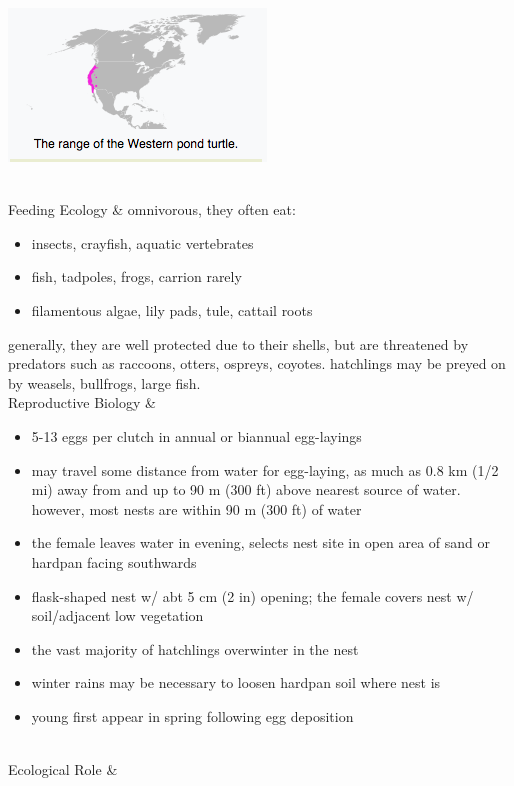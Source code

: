 \begin{center}
\begin{longtabu}
	\begin{center} \includegraphics[scale=0.8]{testudines/emydidae/actinemys/range} \end{center}
	\\
	\hline
	Feeding Ecology & 
	omnivorous, they often eat:
	\begin{itemize}[noitemsep]
		\item insects, crayfish, aquatic vertebrates
		\item fish, tadpoles, frogs, carrion rarely
		\item filamentous algae, lily pads, tule, cattail roots
	\end{itemize}
	generally, they are well protected due to their shells, but are threatened by predators such as raccoons, otters, ospreys, coyotes. hatchlings may be preyed on by weasels, bullfrogs, large fish.
	\\
	\hline
	Reproductive Biology & 
	\begin{itemize}
		\item 5-13 eggs per clutch in annual or biannual egg-layings
		\item may travel some distance from water for egg-laying, as much as 0.8 km (1/2 mi) away from and up to 90 m (300 ft) above nearest source of water. however, most nests are within 90 m (300 ft) of water 
		\item the female leaves water in evening, selects nest site in open area of sand or hardpan facing southwards
		\item flask-shaped nest w/ abt 5 cm (2 in) opening; the female covers nest w/ soil/adjacent low vegetation
		\item the vast majority of hatchlings overwinter in the nest
		\item winter rains may be necessary to loosen hardpan soil where nest is
		\item young first appear in spring following egg deposition
	\end{itemize}
	\\
	\hline
	Ecological Role &
	

\end{longtabu}
\end{center}
